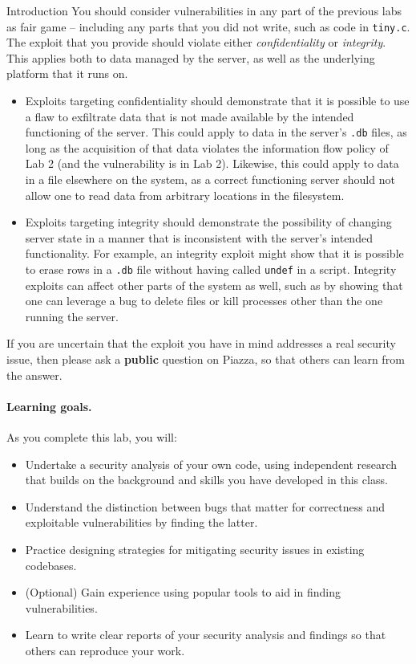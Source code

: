 \documentclass[11pt]{article}
\begin{document}
\begin{problem}{Introduction}
You should consider vulnerabilities in any part of the previous labs as fair game -- including any parts that you did not write, such as code in \verb'tiny.c'. The exploit that you provide should violate either \emph{confidentiality} or \emph{integrity}. This applies both to data managed by the server, as well as the underlying platform that it runs on.
\begin{itemize}
\item Exploits targeting confidentiality should demonstrate that it is possible to use a flaw to exfiltrate data that is not made available by the intended functioning of the server. This could apply to data in the server's \verb'.db' files, as long as the acquisition of that data violates the information flow policy of Lab 2 (and the vulnerability is in Lab 2). Likewise, this could apply to data in a file elsewhere on the system, as a correct functioning server should not allow one to read data from arbitrary locations in the filesystem.
\item Exploits targeting integrity should demonstrate the possibility of changing server state in a manner that is inconsistent with the server's intended functionality. For example, an integrity exploit might show that it is possible to erase rows in a \verb'.db' file without having called \verb'undef' in a script. Integrity exploits can affect other parts of the system as well, such as by showing that one can leverage a bug to delete files or kill processes other than the one running the server.
\end{itemize}
If you are uncertain that the exploit you have in mind addresses a real security issue, then please ask a \textbf{public} question on Piazza, so that others can learn from the answer.
  
  \paragraph{Learning goals.}
    As you complete this lab, you will:
    \begin{itemize}
      \item Undertake a security analysis of your own code, using independent research that builds on the background and skills you have developed in this class.
      \item Understand the distinction between bugs that matter for correctness and exploitable vulnerabilities by finding the latter.
      \item Practice designing strategies for mitigating security issues in existing codebases.
      \item (Optional) Gain experience using popular tools to aid in finding vulnerabilities.
      \item Learn to write clear reports of your security analysis and findings so that others can reproduce your work.
    \end{itemize}


\end{problem}
\end{document}

